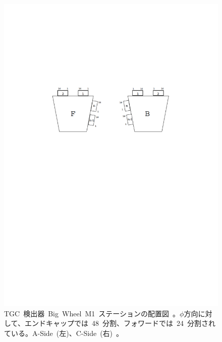 \begin{figure}[H]
\begin{minipage}{0.49\hsize}
        \includegraphics[width=\textwidth,page=3]{img/pdf/TGC.pdf}
        \end{minipage}
        \caption[TGC 検出器~Big~Wheel~M1~ステーションの配置図]{TGC~検出器~Big~Wheel~M1~ステーションの配置図~\cite{TR:02}。$\phi$方向に対して、エンドキャップでは~48~分割、フォワードでは~24~分割されている。A-Side~(左)、C-Side~(右)~。}
        \label{fig:tgcBW}
\end{figure}

